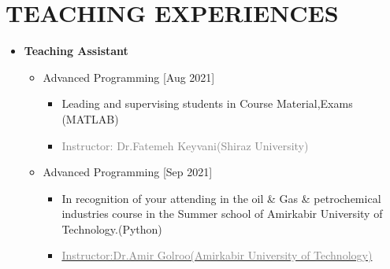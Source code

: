 \documentclass[10pt,a4paper,sans]{moderncv} %
\begin{document}
	
	\vspace{-1.8em}
	
	
	 \vspace{0.7em}
	
	
	\section{TEACHING EXPERIENCES}
	\begin{itemize}
		\item \textbf{Teaching Assistant}    
		\vspace{0.5em}
		\begin{itemize}
			\item {} Advanced Programming   \hfill[Aug 2021]
			\begin{itemize} 
    				\item Leading and supervising students in Course Material,Exams (MATLAB)
				\item\textcolor{gray}{Instructor: Dr.Fatemeh Keyvani(Shiraz University)}
			\end{itemize}
	 		

			
		
	\end{itemize}
	
	\vspace{0.5em}
	
	\begin{itemize}
			\item {}  Advanced Programming  \hfill[Sep 2021]
			\begin{itemize} 
				\item In recognition of your attending in the oil \& Gas \& petrochemical industries course in the Summer school of Amirkabir University of Technology.(Python)
				\item\href{https://aut.ac.ir/cv/2035/amir-golroo?slc_lang=en&&cv=2035&mod=scv}{\textcolor{gray}{Instructor:Dr.Amir Golroo(Amirkabir University of Technology)}}
			\end{itemize}


\end{itemize}
\end{itemize}
\end{document}

